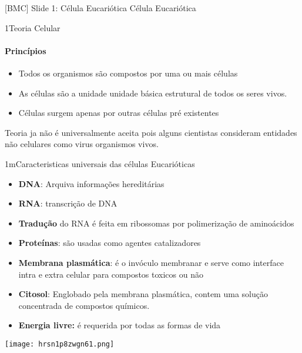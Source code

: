 \documentclass[\mainfilename]{subfiles}
\begin{document}
[BMC]
{Slide 1: Célula Eucariótica} %
{Célula Eucariótica} %

\begin{sectionBox}1{Teoria Celular} %
    
    \paragraph*{Princípios}
    \begin{itemize}
        \item Todos os organismos são compostos por uma ou mais células
        \item As células são a unidade unidade básica estrutural de todos os seres vivos.
        \item Células surgem apenas por outras células pré existentes
    \end{itemize}

    Teoria ja não é universalmente aceita pois alguns cientistas consideram entidades não celulares como virus organismos vivos.
    
\end{sectionBox}

\begin{sectionBox}1m{Caracteristicas universais das células Eucarióticas} %
    
    \begin{itemize}
        \item \textbf{DNA}: Arquiva informações hereditárias
        \item \textbf{RNA}: transcrição de DNA
        \item \textbf{Tradução} do RNA é feita em ribossomas por polimerização de aminoácidos
        \item \textbf{Proteínas}: são usadas como agentes catalizadores
        \item \textbf{Membrana plasmática}: é o invóculo membranar e serve como interface intra e extra celular para compostos toxicos ou não
        \item \textbf{Citosol}: Englobado pela membrana plasmática, contem uma solução concentrada de compostos químicos.
        \item \textbf{Energia livre:} é requerida por todas as formas de vida
    \end{itemize}

    \begin{center}
        \texttt{[image: hrsn1p8zwgn61.png]}
    \end{center}
    
\end{sectionBox}
\end{document}
